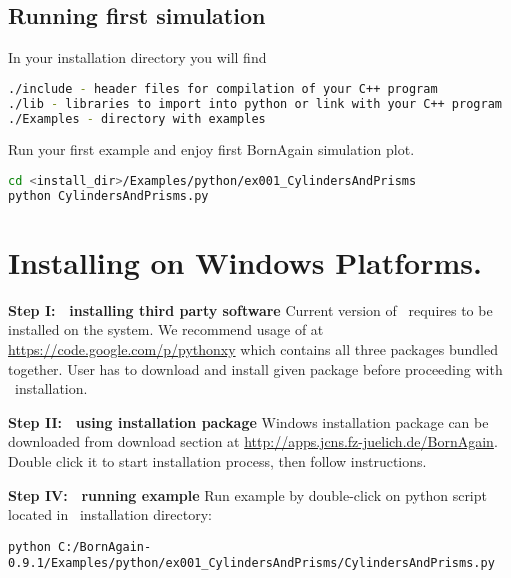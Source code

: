\subsection{Running first simulation}

In your installation directory you will find
\begin{lstlisting}[language=bash, style=commandline]
./include - header files for compilation of your C++ program
./lib - libraries to import into python or link with your C++ program
./Examples - directory with examples
\end{lstlisting}

Run your first example and enjoy first BornAgain simulation plot.
\begin{lstlisting}[language=bash, style=commandline]
cd <install_dir>/Examples/python/ex001_CylindersAndPrisms
python CylindersAndPrisms.py
\end{lstlisting}




\section{Installing on Windows Platforms.} 


\noindent
{\bf Step I: $~$ installing third party software} \newline
Current version of \BornAgain\ requires  
to be installed on the system.
We recommend usage of 
at \url{https://code.google.com/p/pythonxy} which contains all three packages bundled
together. User has to download and install given package before proceeding with
\BornAgain\ installation.
\vspace*{2mm}

\noindent
{\bf Step II: $~$ using installation package } \newline
Windows installation package can be downloaded from download section at \url{http://apps.jcns.fz-juelich.de/BornAgain}.
Double click it to start installation process, then follow instructions.
\vspace*{2mm}

\noindent
{\bf Step IV: $~$ running example} \newline
Run example by double-click on python script located in \BornAgain\ installation directory:
\begin{lstlisting}[language=shell, style=commandline]
python C:/BornAgain-0.9.1/Examples/python/ex001_CylindersAndPrisms/CylindersAndPrisms.py
\end{lstlisting}





